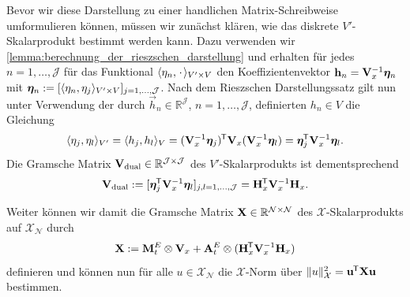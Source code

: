 \documentclass[../main.tex]{subfiles}
\begin{document}
Bevor wir diese Darstellung zu einer handlichen Matrix-Schreibweise umformulieren können, müssen wir zunächst klären, wie das diskrete $V'$-Skalarprodukt bestimmt werden kann.
Dazu verwenden wir \cref{lemma:berechnung_der_rieszschen_darstellung} und erhalten für jedes $n = 1, \dots, \mathcal J$ für das Funktional $\langle\eta_{n},{\mkern2mu\cdot\mkern2mu}\rangle_{V' \times V}$ den Koeffizientenvektor $\mathbf{h}_{n} = \mathbf{V}_{x}^{-1} \bm \eta_{n}$ mit $\bm \eta_{n} := [\langle\eta_{n},\eta_{j}\rangle_{V' \times V}]_{j = 1, \dots, \mathcal J}$.
Nach dem Rieszschen Darstellungssatz gilt nun unter Verwendung der durch $\vec{h}_{n} \in \mathbb{R}^{\mathcal J}$, $n = 1, \dots, \mathcal J$, definierten $h_n \in V$ die Gleichung
\begin{equation}
    \langle\eta_{j},\eta_{l}\rangle_{V'} = \langle h_{j},h_{l}\rangle_{V} = (\mathbf{V}_{x}^{-1} \bm \eta_{j})^{\mkern-1.5mu\mathsf{T}} \mathbf{V}_{x} (\mathbf{V}_{x}^{-1} \bm \eta_{l}) = \bm{\eta}_{j}^{\mkern-1.5mu\mathsf{T}} \mathbf{V}_{x}^{-1} \bm{\eta}_{l}.
\end{equation}
Die Gramsche Matrix $\mathbf{V}_{\mathrm{dual}} \in \mathbb{R}^{\mathcal J \times \mathcal J}$ des $V'$-Skalarprodukts ist dementsprechend
\begin{equation}
    \mathbf{V}_{\mathrm{dual}} := [\bm{\eta}_{j}^{\mkern-1.5mu\mathsf{T}} \mathbf{V}_{x}^{-1} \bm{\eta}_{l}]_{j,l = 1, \dots, \mathcal J} = \mathbf{H}_{x}^{\mkern-1.5mu\mathsf{T}} \mathbf{V}_{x}^{-1} \mathbf{H}_{x}.
\end{equation}

Weiter können wir damit die Gramsche Matrix $\mathbf{X} \in \mathbb{R}^{\mathcal N \times \mathcal N}$ des $\mathcal X$-Skalarprodukts auf $\mathcal X_{\mathcal N}$ durch
\begin{equation}
    \mathbf{X} := \mathbf{M}^{E}_{t} \otimes \mathbf{V}_{x} + \mathbf{A}^{E}_{t} \otimes (\mathbf{H}_{x}^{\mkern-1.5mu\mathsf{T}} \mathbf{V}_{x}^{-1} \mathbf{H}_{x})
\end{equation}
definieren und können nun für alle $u \in \mathcal X_{\mathcal N}$ die $\mathcal X$-Norm über $\lVert u\rVert_{\mathcal X}^{2} = \mathbf{u}^{\mkern-1.5mu\mathsf{T}} \mathbf{X} \mathbf{u}$ bestimmen.
\end{document}

